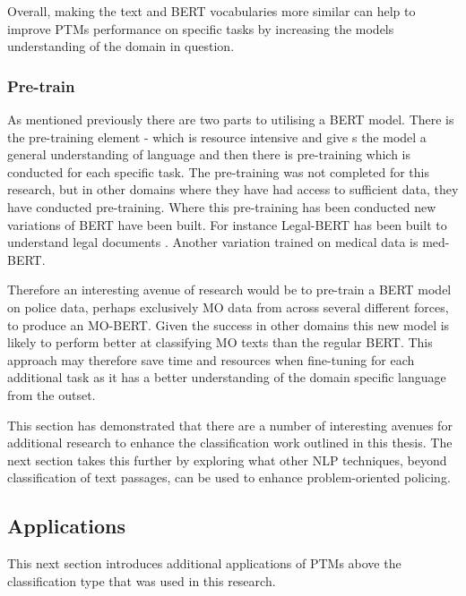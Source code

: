 Overall, making the text and BERT vocabularies more similar can help to improve PTMs performance on specific tasks by increasing the models understanding of the domain in question.

\subsubsection{Pre-train} As mentioned previously there are two parts to utilising a BERT model. There is the pre-training element - which is resource intensive and  give s the model a general understanding of language and then there is pre-training which is  conducted for each specific task. The pre-training was not completed for this research, but in other domains where they have had access to sufficient data, they have conducted pre-training. Where this pre-training has been conducted new variations of BERT have been built. For instance Legal-BERT has been built to understand legal documents \parencite{legal_bert}. Another variation trained on medical data is med-BERT. 

Therefore an interesting avenue of research would be to pre-train a BERT model on police data, perhaps exclusively MO data from across several different forces, to produce an MO-BERT. Given the success in other domains this new model is likely to perform better at classifying MO texts than the regular BERT. This approach may therefore save time and resources when fine-tuning for each additional task as it has a better understanding of the domain specific language from the outset.

This section has demonstrated that there are a number of interesting avenues for additional research to enhance the classification work outlined in this thesis. The next section takes this further by exploring what other NLP techniques, beyond classification of text passages, can be used to enhance problem-oriented policing. 

\subsection{Applications} This next section introduces additional applications of PTMs above the classification type that was used in this research.

